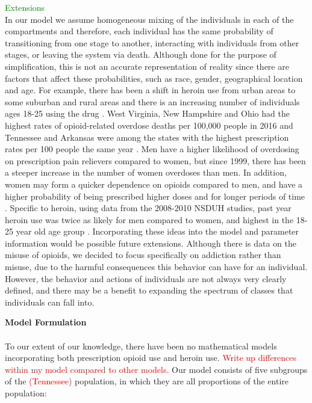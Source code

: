\documentclass[12pt]{article}
\begin{document}
\textcolor{green}{Extensions}\\
In our model we assume homogeneous mixing of the individuals in each of the compartments and therefore, each individual has the same probability of transitioning from one stage to another, interacting with individuals from other stages, or leaving the system via death. Although done for the purpose of simplification, this is not an accurate representation of reality since there are factors that affect these probabilities, such as race, gender, geographical location and age. For example, there has been a shift in heroin use from urban areas to some suburban and rural areas and there is an increasing number of individuals ages 18-25 using the drug \cite{NIDA2}. West Virginia, New Hampshire and Ohio had the highest rates of opioid-related overdose deaths per 100,000 people in 2016 and Tennessee and Arkansas were among the states with the highest prescription rates per 100 people the same year \cite{NIH3}. Men have a higher likelihood of overdosing on prescription pain relievers compared to women, but since 1999, there has been a steeper increase in the number of women overdoses than men. In addition, women may form a quicker dependence on opioids compared to men, and have a higher probability of being prescribed higher doses and for longer periods of time \cite{CDC5}. Specific to heroin, using data from the 2008-2010 NSDUH studies, past year heroin use was twice as likely for men compared to women, and highest in the 18-25 year old age group \cite{Jones}. Incorporating these ideas into the model and parameter information would be possible future extensions. Although there is data on the misuse of opioids, we decided to focus specifically on addiction rather than misuse, due to the harmful consequences this behavior can have for an individual. However, the behavior and actions of individuals are not always very clearly defined, and there may be a benefit to expanding the spectrum of classes that individuals can fall into. 











\textbf{Model Formulation} \\ \\
To our extent of our knowledge, there have been no mathematical models incorporating both prescription opioid use and heroin use. \textcolor{red}{Write up differences within my model compared to other models.}
Our model consists of five subgroups of the \textcolor{red}{(Tennessee)} population, in which they are all proportions of the entire population: 
\end{document}
